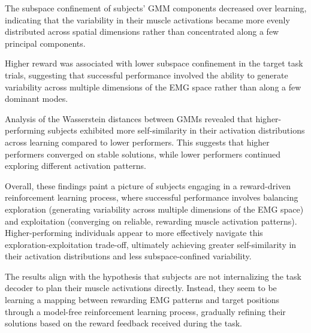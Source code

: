\documentclass[../main.tex]{subfiles}
\begin{document}
The subspace confinement of subjects' GMM components decreased over learning, indicating that the variability in their muscle activations became more evenly distributed across spatial dimensions rather than concentrated along a few principal components.

Higher reward was associated with lower subspace confinement in the target task trials, suggesting that successful performance involved the ability to generate variability across multiple dimensions of the EMG space rather than along a few dominant modes.

Analysis of the Wasserstein distances between GMMs revealed that higher-performing subjects exhibited more self-similarity in their activation distributions across learning compared to lower performers. This suggests that higher performers converged on stable solutions, while lower performers continued exploring different activation patterns.

Overall, these findings paint a picture of subjects engaging in a reward-driven reinforcement learning process, where successful performance involves balancing exploration (generating variability across multiple dimensions of the EMG space) and exploitation (converging on reliable, rewarding muscle activation patterns). Higher-performing individuals appear to more effectively navigate this exploration-exploitation trade-off, ultimately achieving greater self-similarity in their activation distributions and less subspace-confined variability.

The results align with the hypothesis that subjects are not internalizing the task decoder to plan their muscle activations directly. Instead, they seem to be learning a mapping between rewarding EMG patterns and target positions through a model-free reinforcement learning process, gradually refining their solutions based on the reward feedback received during the task.


\cleardoublepage\printendnotes%
\ifSubfilesClassLoaded{%
    \newpage%
}{}%
\end{document}
